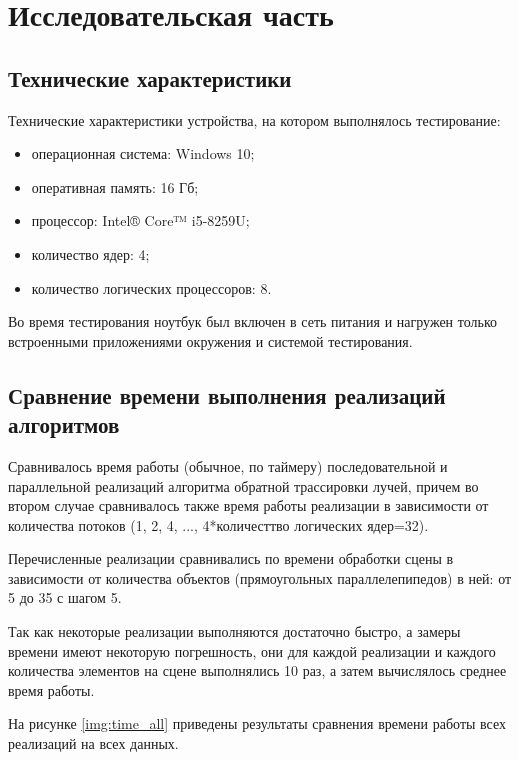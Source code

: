 \chapter{Исследовательская часть}

\section{Технические характеристики}

Технические характеристики устройства, на котором выполнялось тестирование:

\begin{itemize}
	\item операционная система: Windows 10;
	\item оперативная память: 16 Гб;
	\item процессор: Intel® Core™ i5-8259U;
	\item количество ядер: 4;
	\item количество логических процессоров: 8.
\end{itemize}

Во время тестирования ноутбук был включен в сеть питания и нагружен только встроенными приложениями окружения и системой тестирования.


\section{Сравнение времени выполнения реализаций алгоритмов}

Сравнивалось время работы (обычное, по таймеру) последовательной и параллельной реализаций алгоритма обратной трассировки лучей, причем во втором случае сравнивалось также время работы реализации в зависимости от количества потоков (1, 2, 4, ..., 4*количесттво логических ядер=32).

Перечисленные реализации сравнивались по времени обработки сцены в зависимости от количества объектов (прямоугольных параллелепипедов) в ней: от 5 до 35 с шагом 5. 
 
Так как некоторые реализации выполняются достаточно быстро, а замеры времени имеют некоторую погрешность, они для каждой реализации и каждого количества элементов на сцене выполнялись 10 раз, а затем вычислялось среднее время работы.
 

На рисунке \ref{img:time_all} приведены результаты сравнения времени работы всех реализаций на всех данных. 


